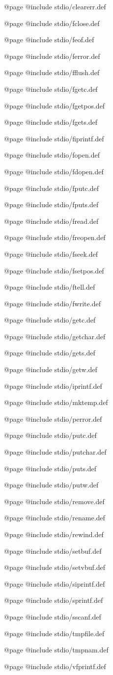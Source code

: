 @page
@include stdio/clearerr.def

@page
@include stdio/fclose.def

@page
@include stdio/feof.def

@page
@include stdio/ferror.def

@page
@include stdio/fflush.def

@page 
@include stdio/fgetc.def 

@page
@include stdio/fgetpos.def

@page 
@include stdio/fgets.def 

@page
@include stdio/fiprintf.def

@page
@include stdio/fopen.def

@page
@include stdio/fdopen.def

@page
@include stdio/fputc.def

@page
@include stdio/fputs.def

@page
@include stdio/fread.def

@page
@include stdio/freopen.def

@page
@include stdio/fseek.def

@page
@include stdio/fsetpos.def

@page
@include stdio/ftell.def

@page
@include stdio/fwrite.def

@page 
@include stdio/getc.def 

@page
@include stdio/getchar.def 

@page 
@include stdio/gets.def

@page 
@include stdio/getw.def 

@page
@include stdio/iprintf.def 

@page
@include stdio/mktemp.def

@page
@include stdio/perror.def

@page
@include stdio/putc.def

@page
@include stdio/putchar.def

@page
@include stdio/puts.def

@page 
@include stdio/putw.def 

@page
@include stdio/remove.def

@page
@include stdio/rename.def

@page
@include stdio/rewind.def

@page
@include stdio/setbuf.def

@page
@include stdio/setvbuf.def

@page 
@include stdio/siprintf.def 

@page 
@include stdio/sprintf.def 

@page
@include stdio/sscanf.def 

@page
@include stdio/tmpfile.def

@page
@include stdio/tmpnam.def

@page 
@include stdio/vfprintf.def 


